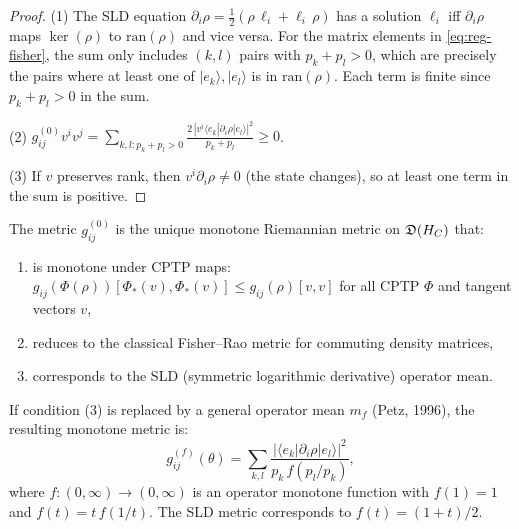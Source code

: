 \begin{proof}
(1) The SLD equation $\partial_i\rho = \frac{1}{2}(\rho\,\ell_i +
\ell_i\,\rho)$ has a solution $\ell_i$ iff $\partial_i\rho$ maps
$\ker(\rho)$ to $\mathrm{ran}(\rho)$ and vice versa.  For the
matrix elements in \eqref{eq:reg-fisher}, the sum only includes
$(k, l)$ pairs with $p_k + p_l > 0$, which are precisely the pairs
where at least one of $|e_k\rangle, |e_l\rangle$ is in
$\mathrm{ran}(\rho)$.  Each term is finite since $p_k + p_l > 0$
in the sum.

(2) $g_{ij}^{(0)} v^i v^j = \sum_{k,l: p_k+p_l > 0}
\frac{2\,|v^i\langle e_k|\partial_i\rho|e_l\rangle|^2}{p_k + p_l}
\geq 0$.

(3) If $v$ preserves rank, then $v^i \partial_i\rho \neq 0$ (the
state changes), so at least one term in the sum is positive.
\end{proof}

\begin{theorem}\label{thm:15.3}
The metric $g_{ij}^{(0)}$ is the unique monotone Riemannian metric on
$\mathfrak{D}(H_C)$ that:
\begin{enumerate}
  \item is monotone under CPTP maps: $g_{ij}(\Phi(\rho))
        [\Phi_*(v), \Phi_*(v)] \leq g_{ij}(\rho)[v, v]$ for all
        CPTP $\Phi$ and tangent vectors $v$,
  \item reduces to the classical Fisher--Rao metric for commuting
        density matrices,
  \item corresponds to the SLD (symmetric logarithmic derivative)
        operator mean.
\end{enumerate}
If condition (3) is replaced by a general operator mean $m_f$
(Petz, 1996), the resulting monotone metric is:
\begin{equation}\label{eq:petz-metric}
  g_{ij}^{(f)}(\theta) = \sum_{k,l}
  \frac{|\langle e_k|\partial_i\rho|e_l\rangle|^2}
  {p_k\,f(p_l / p_k)},
\end{equation}
where $f : (0, \infty) \to (0, \infty)$ is an operator monotone
function with $f(1) = 1$ and $f(t) = t\,f(1/t)$.
The SLD metric corresponds to $f(t) = (1 + t)/2$.
\end{theorem}

